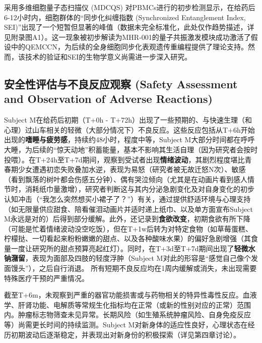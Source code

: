 采用多维细胞量子态扫描仪 (MDCQS) 对PBMCs进行的初步检测显示，在给药后6-12小时内，细胞群体的“同步化纠缠指数 (Synchronized Entanglement Index, SEI)”出现了一个短暂但显著的峰值（数据未完全标准化，此处仅作趋势描述，详见附录图A1）。这一现象被初步解读为MHR-001的量子共振激发模块成功激活了假设中的QEMCCN，为后续的全身细胞同步化表观遗传重编程提供了理论支持。然而，该技术的验证和SEI的生物学意义尚需进一步深入研究。

\subsection{安全性评估与不良反应观察 (Safety Assessment and Observation of Adverse Reactions)}

Subject M在给药后初期（T+0h - T+72h）出现了一些预期的、与快速生理（和心理）过山车相关的轻微（大部分情况下）不良反应。这些反应包括从T+6h开始出现的\textbf{嗜睡与疲劳感}，持续约48小时，程度中等，Subject M大部分时间都在呼呼大睡，为后续的“惊天动地”积蓄能量，基本不影响其生活自理（因为研究者会按时投喂）。在T+24h至T+7d期间，观察到受试者出现\textbf{情绪波动}，其剧烈程度堪比青春期少女遭遇初恋失败叠加水逆，表现为易怒（研究者被无故迁怒N次）、敏感（看到飘落的树叶都会伤感五分钟）、偶有哭泣倾向（尤其是在动画片看到感人情节时，消耗纸巾量激增），研究者判断这与其内分泌急剧变化及对自身变化的初步认知冲击（“我怎么突然想买小裙子了？”）有关，通过提供舒适环境与心理支持（如无限量供应甜食、陪看催泪动画片并适时递上纸巾、以及单方面宣布Subject M永远是对的）后得到部分缓解。此外，还记录到\textbf{食欲改变}，初期食欲有所下降（可能是忙着情绪波动没空吃饭），但在T+1w后转为对特定食物（如草莓蛋糕、柠檬挞、一切看起来粉粉嫩嫩的甜点、以及各种酸味水果）的偏好急剧增强（其食量一度让研究所的甜点预算亮起红灯）。同时，在T+3d至T+7d期间出现了\textbf{轻微水钠潴留}，表现为面部及四肢的轻度浮肿（Subject M对此的形容是“感觉自己像个发面馒头”），之后自行消退。
所有短期不良反应均在1周内缓解或消失，未出现需要特殊医疗干预的严重情况。

截至T+6m，未观察到严重的器官功能损害或与药物相关的特异性毒性反应。血液学、肝肾功能、电解质等常规生化指标均在正常（或新的性别对应的正常）范围内。肿瘤标志物筛查未见异常。长期风险（如生殖系统肿瘤风险、自身免疫反应等）尚需更长时间的持续监测。Subject M对新身体的适应性良好，心理状态在经历初期波动后逐渐稳定，并表现出对新身份的积极探索（详见第四章讨论）。